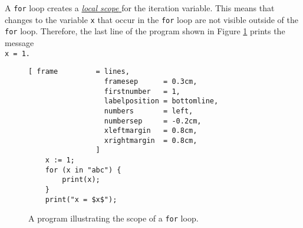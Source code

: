 A \texttt{for} loop creates a 
\href{http://en.wikipedia.org/wiki/Variable_scope}{\emph{local scope} }
for the iteration variable.  This means that changes to the variable \texttt{x} that occur in the
\texttt{for} loop are not visible outside of the \texttt{for} loop.
Therefore, the last
line of the program shown in Figure \ref{fig:scope-for-loop.stlx} prints the message
\\[0.2cm]
\hspace*{1.3cm}
\texttt{x = 1.}

\begin{figure}[!ht]
\centering
\begin{Verbatim}[ frame         = lines, 
                  framesep      = 0.3cm, 
                  firstnumber   = 1,
                  labelposition = bottomline,
                  numbers       = left,
                  numbersep     = -0.2cm,
                  xleftmargin   = 0.8cm,
                  xrightmargin  = 0.8cm,
                ]
    x := 1;
    for (x in "abc") {
        print(x);
    }
    print("x = $x$");
\end{Verbatim}
\vspace*{-0.3cm}
\caption{A program illustrating the scope of a \texttt{for} loop.}
\label{fig:scope-for-loop.stlx}
\end{figure}




